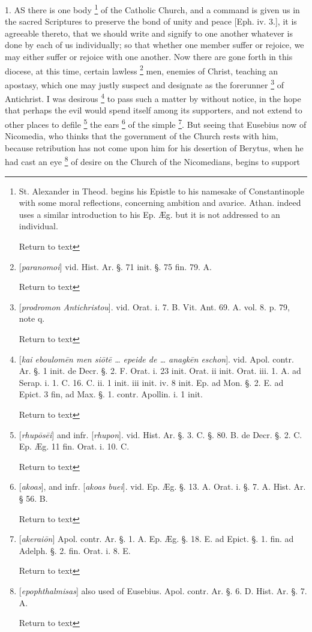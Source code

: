 1. AS
there is one body \footnote{St. Alexander in Theod. begins his Epistle to
his namesake of Constantinople with some moral reflections, concerning
ambition and avarice. Athan. indeed uses a similar introduction to his
Ep. Æg. but it is not addressed to an individual.

Return to text} of the
Catholic Church, and a command is given us in the sacred Scriptures to
preserve the bond of unity and peace [Eph. iv. 3.], it is agreeable
thereto, that we should write and signify to one another whatever is
done by each of us individually; so that whether one member suffer or
rejoice, we may either suffer or rejoice with one another. Now there
are gone forth in this diocese, at this time, certain lawless \footnote{[\emph{paranomoi}] vid. Hist. Ar. §. 71 init. §. 75 fin. 79. A.

Return to text} men, enemies of Christ, teaching an apostasy, which one may
justly suspect and designate as the forerunner \footnote{[\emph{prodromon Antichristou}]. vid. Orat. i. 7. B. Vit. Ant. 69. A.
vol. 8. p. 79, note q.

Return to text} of Antichrist. I was desirous \footnote{[\emph{kai eboulom\={e}n men si\={o}t\={e} … epeide de …
anagk\={e}n eschon}]. vid. Apol. contr. Ar. §. 1 init. de Decr.
§. 2. F. Orat. i. 23 init. Orat. ii init. Orat. iii. 1. A. ad Serap.
i. 1. C. 16. C. ii. 1 init. iii init. iv. 8 init. Ep. ad Mon. §. 2.
E. ad Epict. 3 fin, ad Max. §. 1. contr. Apollin. i. 1 init.

Return to text} to pass such a matter by without notice, in the hope that
perhaps the evil would spend itself among its supporters, and not
extend to other places to defile \footnote{[\emph{rhup\={o}s\={e}i}] and infr. [\emph{rhupon}]. vid. Hist.
Ar. §. 3. C. §. 80. B. de Decr. §. 2. C. Ep. Æg. 11 fin. Orat. i.
10. C.

Return to text} the ears \footnote{[\emph{akoas}], and infr. [\emph{akoas buei}]. vid. Ep. Æg. §. 13.
A. Orat. i. §. 7. A. Hist. Ar. § 56. B.

Return to text} of the
simple \footnote{[\emph{akerai\={o}n}] Apol. contr. Ar. §. 1. A. Ep. Æg. §. 18.
E. ad Epict. §. 1. fin. ad Adelph. §. 2. fin. Orat. i. 8. E.

Return to text}. But seeing that
Eusebius now of Nicomedia, who thinks that the government of the
Church rests with him, because retribution has not come upon him for
his desertion of Berytus, when he had cast an eye \footnote{[\emph{epophthalmisas}] also used of Eusebius. Apol. contr. Ar. §. 6.
D. Hist. Ar. §. 7. A.

Return to text} of desire on the Church of the Nicomedians, begins to support
